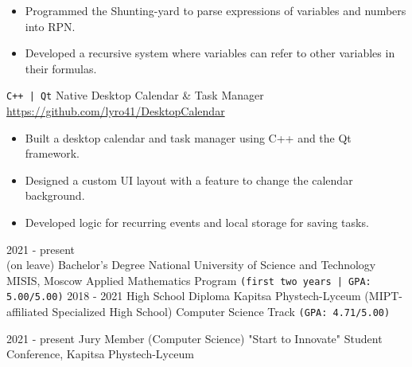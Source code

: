 \documentclass[9pt]{developercv} %
\begin{document}
\begin{entrylist}
{\begin{itemize}[noitemsep,topsep=0pt,parsep=0pt,partopsep=0pt, leftmargin=-1pt]
            \item Programmed the Shunting-yard to parse expressions of variables and numbers into RPN.
            \item Developed a recursive system where variables can refer to other variables in their formulas.
        \end{itemize}}
    \entry
		{\texttt{C++ | Qt}}
		{Native Desktop Calendar \& Task Manager}
		{\href{https://github.com/lyro41/DesktopCalendar}{https://github.com/lyro41/DesktopCalendar}}
		{\vspace{-10pt}
        \begin{itemize}[noitemsep,topsep=0pt,parsep=0pt,partopsep=0pt, leftmargin=-1pt]
            \item Built a desktop calendar and task manager using C++ and the Qt framework. 
            \item Designed a custom UI layout with a feature to change the calendar background.
            \item Developed logic for recurring events and local storage for saving tasks.
        \end{itemize}}
\end{entrylist}

\vspace{-15 pt}
\begin{entrylist}
    \entry
		{2021 - present \\ (on leave)}
		{Bachelor's Degree}
		{National University of Science and Technology MISIS, Moscow}
		{Applied Mathematics Program \hfill \texttt{(first two years | GPA: 5.00/5.00)}}
    \entry
		{2018 - 2021}
		{High School Diploma}
		{Kapitsa Phystech-Lyceum (MIPT-affiliated Specialized High School)}
		{Computer Science Track \hfill  \texttt{(GPA: 4.71/5.00)}}
\end{entrylist}

\vspace{-15 pt}
\begin{entrylist}
    \entry
		{2021 - present}
		{Jury Member (Computer Science)}
		{"Start to Innovate" Student Conference, Kapitsa Phystech-Lyceum}
		{}
\end{entrylist}
\end{document}
